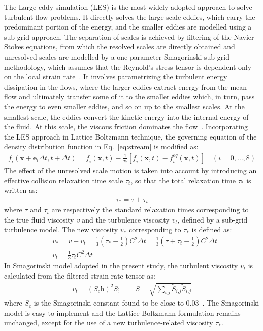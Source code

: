 The Large eddy simulation (LES) is the most widely adopted approach to solve turbulent flow problems. It directly solves the large scale eddies, which carry the predominant portion of the energy, and the smaller eddies are modelled using a sub-grid approach. The separation of scales is achieved by filtering of the Navier-Stokes equations, from which the resolved scales are directly obtained and unresolved scales are modelled by a one-parameter Smagorinski sub-grid methodology, which assumes that the Reynold's stress tensor is dependent only on the local strain rate~\citep{smagorinsky1963}. It involves parametrizing the turbulent energy dissipation in the flows, where the larger eddies extract energy from the mean flow and ultimately transfer some of it to the smaller eddies which, in turn, pass the energy to even smaller eddies, and so on up to the smallest scales. At the smallest scale, the eddies convert the kinetic energy into the internal energy of the fluid. At this scale, the viscous friction dominates the flow~\citep{frisch1995}. Incorporating the LES approach in Lattice Boltzmann technique, the governing equation of the density distribution function in Eq.~\eqref{eq:stream} is modified as:
\begin{align}
\textit{f}_{\textit{i}}(\textbf{x}+\textbf{e}_{\textit{i}} \Delta t, t + \Delta t) = \textit{f}_{\textit{i}}(\textbf{x},t) - \frac{1}{\tau_{*}} [\textit{f}_{\textit{i}}(\textbf{x},t) -\textit{f}_{\textit{i}}^{\textit{eq}}(\textbf{x},t)] \quad (\textit{i}=0,\dots,8)
\end{align}
The effect of the unresolved scale motion is taken into account by introducing an effective collision relaxation time scale $\tau_{t}$, so that the total relaxation time $\tau_{*}$ is written as:
\begin{align}
\tau_{*}=\tau + \tau_{t}
\end{align} 
where $\tau$ and $\tau_{t}$ are respectively the standard relaxation times corresponding to the true fluid viscosity \textit{v} and the turbulence viscosity $\textit{v}_{\textit{t}}$, defined by a sub-grid turbulence model. The new viscosity $\textit{v}_{*}$ corresponding to $\tau_{*}$ is defined as:
\begin{align}
& \textit{v}_{*}=\textit{v}+\textit{v}_{\textit{t}}=\frac{1}{3}(\tau_{*}-\frac{1}{2})\textit{C}^{2} \Delta \textit{t} =\frac{1}{3}(\tau+\tau_{t}-\frac{1}{2})\textit{C}^{2} \Delta \textit{t}  \\
& \textit{v}_{\textit{t}}=\frac{1}{3}\tau_{\textit{t}}\textit{C}^{2} \Delta \textit{t}
\end{align}
In Smagorinski model adopted in the present study, the turbulent viscosity $\textit{v}_{t}$ is calculated from the filtered strain rate tensor as:
\begin{align}
\textit{v}_{\textit{t}}=(\textit{S}_{c}\textit{h})^{2}\overline{S}; \qquad \overline{S}=\sqrt{\sum\limits_{\textit{i,j}}{\tilde{S}_{\textit{i,j}}\tilde{S}_{\textit{i,j}}}}
\end{align}
where $\textit{S}_{c}$ is the Smagorinski constant found to be close to 0.03~\citep{yu2005}. The Smagorinski model is easy to implement and the Lattice Boltzmann formulation remains unchanged, except for the use of a new turbulence-related viscosity $\tau_{*}$.

